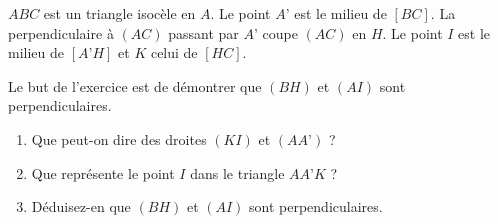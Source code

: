 
$ABC$ est un triangle isocèle en $A$. Le point $A’$ est le milieu de $[BC]$. La perpendiculaire à $(AC)$ passant par $A’$ coupe $(AC)$ en $H$. Le point $I$ est le milieu de $[A’H]$ et $K$ celui de $[HC]$.

Le but de l'exercice est de démontrer que $(BH)$ et $(AI)$ sont perpendiculaires.

\begin{enumerate}
\item Que peut-on dire des droites $(KI)$ et $(AA’)$ ?
\item Que représente le point $I$ dans le triangle $AA’K$ ?
\item Déduisez-en que $(BH)$ et $(AI)$ sont perpendiculaires.
\end{enumerate}